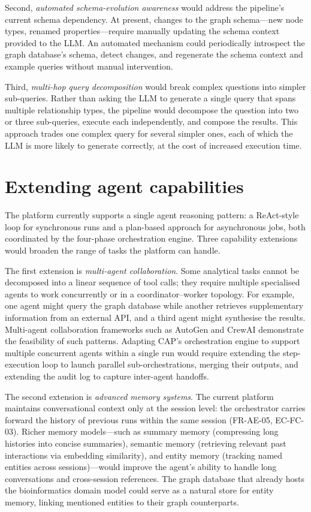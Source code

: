 \documentclass[a4paper,noexaminfo]{sapthesis}
\begin{document}
Second, \emph{automated schema-evolution awareness} would address the
pipeline's current schema dependency.  At present, changes to the graph
schema---new node types, renamed properties---require manually updating
the schema context provided to the LLM.  An automated mechanism could
periodically introspect the graph database's schema, detect changes, and
regenerate the schema context and example queries without manual
intervention.

Third, \emph{multi-hop query decomposition} would break complex questions
into simpler sub-queries.  Rather than asking the LLM to generate a single
query that spans multiple relationship types, the pipeline would decompose
the question into two or three sub-queries, execute each independently,
and compose the results.  This approach trades one complex query for
several simpler ones, each of which the LLM is more likely to generate
correctly, at the cost of increased execution time.

\section{Extending agent capabilities}
\label{sec:fw-agent}

The platform currently supports a single agent reasoning pattern:
a ReAct-style loop for synchronous runs and a plan-based approach for
asynchronous jobs, both coordinated by the four-phase orchestration
engine.  Three capability extensions would broaden the range of tasks the
platform can handle.

The first extension is \emph{multi-agent collaboration}.  Some analytical
tasks cannot be decomposed into a linear sequence of tool calls; they
require multiple specialised agents to work concurrently or in a
coordinator--worker topology.  For example, one agent might query the graph
database while another retrieves supplementary information from an
external API, and a third agent might synthesise the results.
Multi-agent collaboration frameworks such as AutoGen and CrewAI
demonstrate the feasibility of such patterns.  Adapting CAP's
orchestration engine to support multiple concurrent agents within
a single run would require extending the step-execution loop to launch
parallel sub-orchestrations, merging their outputs, and extending the
audit log to capture inter-agent handoffs.

The second extension is \emph{advanced memory systems}.  The current
platform maintains conversational context only at the session level:
the orchestrator carries forward the history of previous runs within
the same session (FR-AE-05, EC-FC-03).  Richer memory models---such as
summary memory (compressing long histories into concise summaries),
semantic memory (retrieving relevant past interactions via embedding
similarity), and entity memory (tracking named entities across
sessions)---would improve the agent's ability to handle long
conversations and cross-session references.  The graph database that
already hosts the bioinformatics domain model could serve as a natural
store for entity memory, linking mentioned entities to their graph
counterparts.
\end{document}
